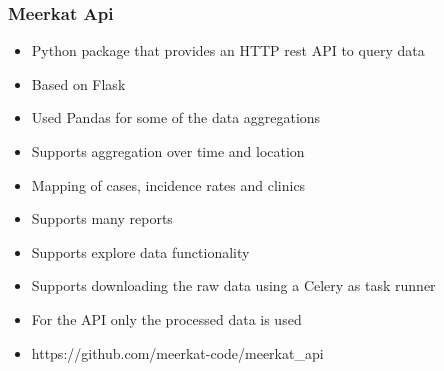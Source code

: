 \documentclass{beamer}
\begin{document}
\begin{frame}
    \frametitle{Meerkat Api}
    \begin{itemize}
    \item Python package that provides an HTTP rest API to query data
    \item Based on Flask
    \item Used Pandas for some of the data aggregations
    \item Supports aggregation over time and location
    \item Mapping of cases, incidence rates and clinics
    \item Supports many reports
    \item Supports explore data functionality
    \item Supports downloading the raw data using a Celery as task runner
    \item For the API only the processed data is used
    \item https://github.com/meerkat-code/meerkat\_api
    \end{itemize}
\end{frame}
\end{document}
